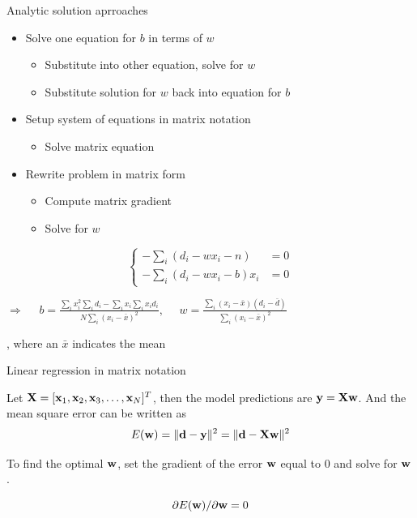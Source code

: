\documentclass[notes]{beamer}
\providecommand{\tightlist}{%
  \setlength{\itemsep}{0pt}\setlength{\parskip}{0pt}}
\begin{document}
\begin{frame}{Analytic solution aprroaches}

\begin{itemize}
\tightlist
\item
  Solve one equation for \(b\) in terms of \(w\)

  \begin{itemize}
  \tightlist
  \item
    Substitute into other equation, solve for \(w\)
  \item
    Substitute solution for \(w\) back into equation for \(b\)
  \end{itemize}
\item
  Setup system of equations in matrix notation

  \begin{itemize}
  \tightlist
  \item
    Solve matrix equation
  \end{itemize}
\item
  Rewrite problem in matrix form

  \begin{itemize}
  \tightlist
  \item
    Compute matrix gradient
  \item
    Solve for \(w\)
  \end{itemize}
\end{itemize}

\[\left\{\begin{array}{cc}
-\sum_{i}(d_i -wx_i -n) & =0 \\  
-\sum_{i} (d_i -wx_i -b) x_i & =0 
\end{array} \right.\]

\(\Rightarrow \quad\) \pause
\(b=\frac{\sum_i x_i^2 \sum_i d_i - \sum_i x_i \sum_i x_i d_i}{N \sum_i (x_i - \bar{x} )^2} , \quad\)
\(w=\frac{\sum_i (x_i - \bar{x}) (d_i - \bar{d}) }{\sum_i (x_i - \bar{x} )^2 }\)

, where an \(\bar{x}\) indicates the mean

\end{frame}

\begin{frame}{Linear regression in matrix notation}

Let \(\mathbf{X} = [\mathbf{x}_1 ,\mathbf{x}_2 ,\mathbf{x}_3 ,\dots ,\mathbf{x}_N]^T\), then the model
predictions are \(\mathbf{y}=\mathbf{X} \mathbf{w}\). And the mean square error can be
written as \[E(\mathbf{w})=\|\mathbf{d} - \mathbf{y}\|^2 = \|\mathbf{d} -\mathbf{X} \mathbf{w}\|^2\]

To find the optimal \(\mathbf{w}\), set the gradient of the error \wrt \(\mathbf{w}\)
equal to 0 and solve for \(\mathbf{w}\).

\[\partial E(\mathbf{w}) / \partial \mathbf{w}=0\]

\end{frame}
\end{document}
